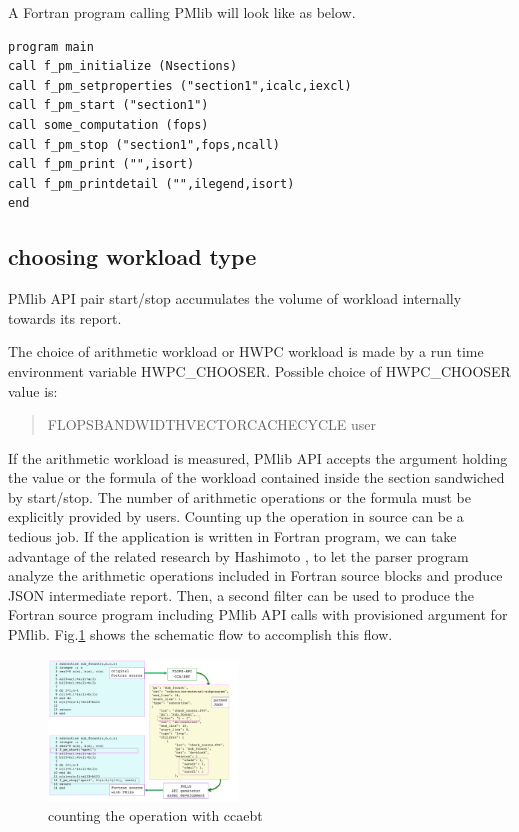 \documentclass[conference]{IEEEtran}
\begin{document}
A Fortran program calling PMlib will look like as below.

\begin{lstlisting}
program main
call f_pm_initialize (Nsections)
call f_pm_setproperties ("section1",icalc,iexcl)
call f_pm_start ("section1")
call some_computation (fops)
call f_pm_stop ("section1",fops,ncall)
call f_pm_print ("",isort)
call f_pm_printdetail ("",ilegend,isort)
end
\end{lstlisting}


\subsection {choosing workload type}
PMlib API pair start/stop accumulates the volume of workload internally
towards its report.

The choice of arithmetic workload or HWPC workload is made by a
run time environment variable HWPC\_CHOOSER.
Possible choice of HWPC\_CHOOSER value is:
\begin{quote}
\begin{small}
FLOPS\textbar BANDWIDTH\textbar VECTOR\textbar CACHE\textbar CYCLE%
\textbar user
\end{small}
\end{quote}

If the arithmetic workload is measured,
PMlib API accepts the argument holding the value or the formula
of the workload contained inside the section sandwiched by start/stop.
The number of arithmetic operations or the formula must be explicitly
provided by users. Counting up the operation in source can be a tedious job.
If the application is written in Fortran program,
we can take advantage of the related research by Hashimoto
\cite{Hoshimoto:2015}, \cite{ccaebt:HPCAsia2018}
to let the parser program analyze the arithmetic operations
included in Fortran source blocks and produce JSON intermediate report.
Then, a second filter can be used to produce the
Fortran source program including PMlib API calls with
provisioned argument for PMlib.
Fig.\ref{fig:ccaebt4PMlib} shows the schematic flow to accomplish this flow.
\begin{figure}[tb]
\centering
\includegraphics[width=0.45\textwidth]{figs/ccaebt4PMlib.pdf}
\caption{counting the operation with ccaebt}
\label{fig:ccaebt4PMlib}
\end{figure}
\end{document}

